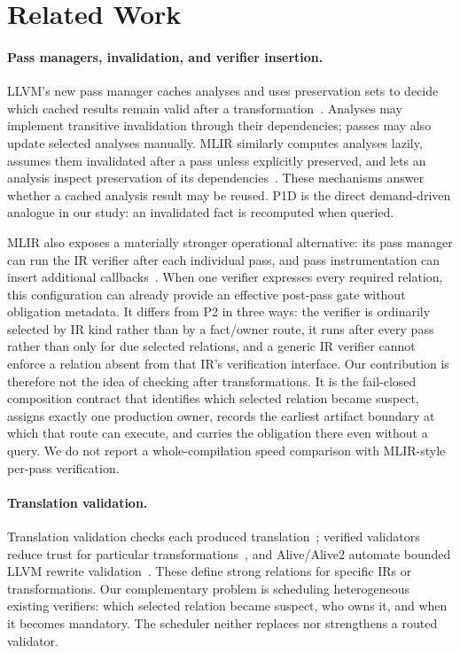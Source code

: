 \section{Related Work}
\paragraph{Pass managers, invalidation, and verifier insertion.}
LLVM's new pass manager caches analyses and uses preservation sets to decide which cached results remain valid after a transformation~\cite{llvmnpm}. Analyses may implement transitive invalidation through their dependencies; passes may also update selected analyses manually. MLIR similarly computes analyses lazily, assumes them invalidated after a pass unless explicitly preserved, and lets an analysis inspect preservation of its dependencies~\cite{mlirpm}. These mechanisms answer whether a cached analysis result may be reused. P1D is the direct demand-driven analogue in our study: an invalidated fact is recomputed when queried.

MLIR also exposes a materially stronger operational alternative: its pass manager can run the IR verifier after each individual pass, and pass instrumentation can insert additional callbacks~\cite{mlirpm}. When one verifier expresses every required relation, this configuration can already provide an effective post-pass gate without obligation metadata. It differs from P2 in three ways: the verifier is ordinarily selected by IR kind rather than by a fact/owner route, it runs after every pass rather than only for due selected relations, and a generic IR verifier cannot enforce a relation absent from that IR's verification interface. Our contribution is therefore not the idea of checking after transformations. It is the fail-closed composition contract that identifies which selected relation became suspect, assigns exactly one production owner, records the earliest artifact boundary at which that route can execute, and carries the obligation there even without a query. We do not report a whole-compilation speed comparison with MLIR-style per-pass verification.

\paragraph{Translation validation.}
Translation validation checks each produced translation~\cite{pnueli98,necula00}; verified validators reduce trust for particular transformations~\cite{tristan08}, and Alive/Alive2 automate bounded LLVM rewrite validation~\cite{alive,alive2}. These define strong relations for specific IRs or transformations. Our complementary problem is scheduling heterogeneous existing verifiers: which selected relation became suspect, who owns it, and when it becomes mandatory. The scheduler neither replaces nor strengthens a routed validator.

